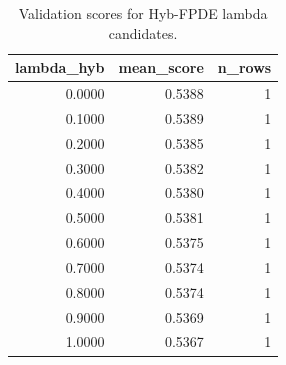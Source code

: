 \begin{table}[t]
\caption{Validation scores for Hyb-FPDE lambda candidates.}
\label{tab:lambda_distribution_computed}
\centering
\begin{tabular}{rrr}
\toprule
lambda\_hyb & mean\_score & n\_rows \\
\midrule
0.0000 & 0.5388 & 1 \\
0.1000 & 0.5389 & 1 \\
0.2000 & 0.5385 & 1 \\
0.3000 & 0.5382 & 1 \\
0.4000 & 0.5380 & 1 \\
0.5000 & 0.5381 & 1 \\
0.6000 & 0.5375 & 1 \\
0.7000 & 0.5374 & 1 \\
0.8000 & 0.5374 & 1 \\
0.9000 & 0.5369 & 1 \\
1.0000 & 0.5367 & 1 \\
\bottomrule
\end{tabular}

\end{table}
